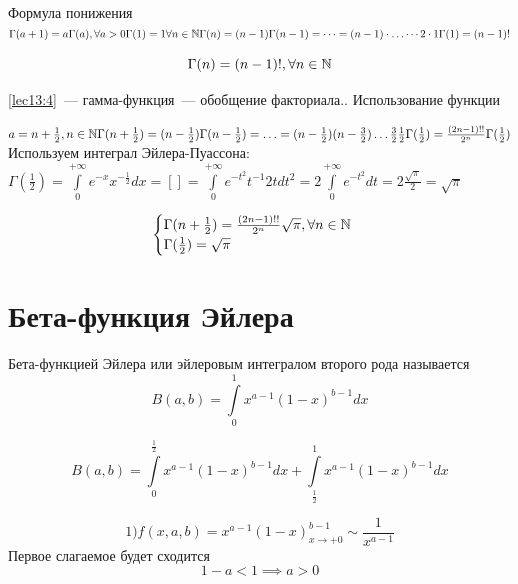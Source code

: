 \documentclass[../../main.tex]{subfiles}
\begin{document}
Формула понижения
\\
$
\Gamma(a+1) = a\Gamma(a), \forall a > 0
\\
\Gamma(1) = 1
\\
\forall n \in \mathbb{N}
\\
\Gamma(n) = (n-1)\Gamma(n-1) = \cdots = (n-1) \cdot \ldots \cdots 2 \cdot 1 
\Gamma(1) = (n-1)!
$

\begin{equation}
\label{lec13:4}
\Gamma(n) = (n-1)!,  \forall n \in \mathbb{N}
\end{equation}

\eqref{lec13:4}~--- гамма-функция~--- обобщение факториала.. 
Использование функции

$
a = n + \frac{1}{2}, n \in \mathbb{N}
\\
\Gamma(n + \frac{1}{2}) = (n - \frac{1}{2})\Gamma(n-\frac{1}{2})=\ldots=
(n-\frac{1}{2})(n-\frac{3}{2})\ldots\frac{3}{2}\frac{1}{2}\Gamma(\frac{1}{2}) 
= 
\frac{(2n-1)!!}{2^n}\Gamma(\frac{1}{2})
$
Используем интеграл Эйлера-Пуассона:
\\
$
\Gamma(\frac{1}{2})= \int\limits_0^{+\infty} e^{-x} x^{-\frac{1}{2}} dx = [] = 
\int\limits_0^{+\infty} e^{-t^2} t^{-1} 2t dt^2 = 2 \int\limits_0^{+\infty} 
e^{-t^2} dt 
= 2 \frac{\sqrt{\pi}}{2} = \sqrt{\pi}
$

\begin{equation}
	\label{lec13:5}
	\begin{cases}
		\Gamma(n+\frac{1}{2}) = \frac{(2n-1)!!}{2^n} \sqrt{\pi}, \forall n \in \mathbb{N} \\
		\Gamma(\frac{1}{2}) = \sqrt{\pi}
	\end{cases}
\end{equation}

\section{Бета-функция Эйлера}
Бета-функцией Эйлера или эйлеровым интегралом второго рода называется
\begin{equation}
	\label{lec13:6}
	B(a, b) = \int\limits_0^1x^{a-1}(1-x)^{b-1}dx
\end{equation}

\begin{equation}
	\label{lec13:7}
	B(a, b) = \int\limits_0^{\frac{1}{2}} 
	x^{a-1} (1-x)^{b-1}dx + \int\limits_{\frac{1}{2}}^{1} 
	x^{a-1}(1-x)^{b-1}dx
\end{equation}


\[1) f(x, a, b) = x^{a-1}(1-x)^{b-1}_{x\to+0} \sim \dfrac{1}{x^{a-1}}\]
Первое слагаемое будет сходится \[ 1 - a < 1 \implies a > 0 \]
\end{document}
